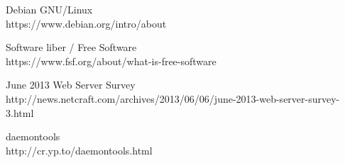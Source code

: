 \documentclass[12pt,a4paper]{article}
\begin{document}
\begin{thebibliography}{99}
	Debian GNU/Linux \\
	https://www.debian.org/intro/about

	Software liber / Free Software \\
	https://www.fsf.org/about/what-is-free-software
	
	June 2013 Web Server Survey\\
http://news.netcraft.com/archives/2013/06/06/june-2013-web-server-survey-3.html
	
	daemontools\\
	http://cr.yp.to/daemontools.html

\end{thebibliography}
\endgroup
\newpage
\tableofcontents
\end{document}
